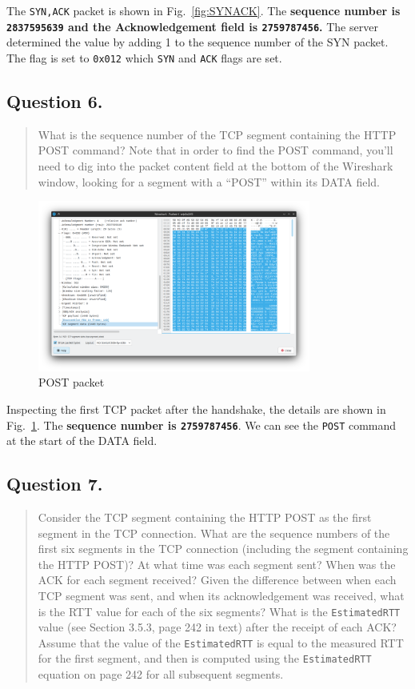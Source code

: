 \documentclass{cshwk}
\begin{document}
The \texttt{SYN,ACK} packet is shown in Fig.~\ref{fig:SYNACK}. The \textbf{sequence number is \texttt{2837595639} and the Acknowledgement field is \texttt{2759787456}.} The server determined the value by adding 1 to the sequence number of the SYN packet. The flag is set to \texttt{0x012} which \texttt{SYN} and \texttt{ACK} flags are set.

\subsection*{Question 6.}
\begin{quote}
    What is the sequence number of the TCP segment containing the HTTP POST
    command? Note that in order to find the POST command, you'll need to dig into the packet content field at the bottom of the Wireshark window, looking for a segment with a “POST” within its DATA field.
\end{quote}

\begin{figure}[htbp]
    \centering
    \includegraphics[width=0.8\textwidth]{./lab3-4.png}
    \caption{POST packet}
    \label{fig:POST}
\end{figure}

Inspecting the first TCP packet after the handshake, the details are shown in Fig.~\ref{fig:POST}. The \textbf{sequence number is \texttt{2759787456}}. We can see the \texttt{POST} command at the start of the DATA field.


\subsection*{Question 7.}
\begin{quote}
    Consider the TCP segment containing the HTTP POST as the first segment in the TCP connection. What are the sequence numbers of the first six segments in the TCP connection (including the segment containing the HTTP POST)? At what time was each segment sent? When was the ACK for each segment received? Given the difference between when each TCP segment was sent, and when its acknowledgement was received, what is the RTT value for each of the six segments? What is the \texttt{EstimatedRTT} value (see Section 3.5.3, page 242 in text) after the receipt of each ACK? Assume that the value of the \texttt{EstimatedRTT} is equal to the measured RTT for the first segment, and then is computed using the \texttt{EstimatedRTT} equation on page 242 for all subsequent
    segments.
\end{quote}
\end{document}
